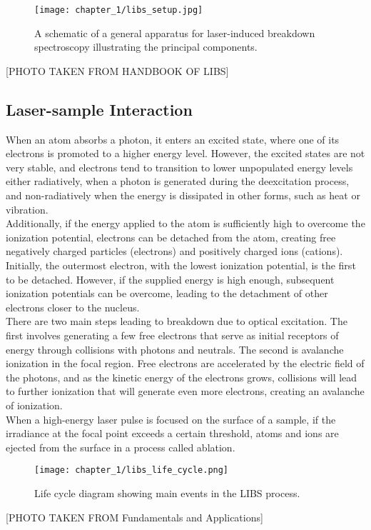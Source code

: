 \begin{figure}[H]
    \centering
    \texttt{[image: chapter\_1/libs\_setup.jpg]}
    \label{fig:libs_setup}
    \\[20pt]
    \caption{A schematic of a general apparatus for laser-induced breakdown spectroscopy illustrating the principal components.}
\end{figure}
[PHOTO TAKEN FROM HANDBOOK OF LIBS]

\subsection{Laser-sample Interaction}
\label{subsec:laser-sample_int}

When an atom absorbs a photon, it enters an excited state, where one of its electrons is promoted to a higher energy level. However, the excited states are not very stable, and electrons tend to transition to lower unpopulated energy levels either radiatively, when a photon is generated during the deexcitation process, and non-radiatively when the energy is dissipated in other forms, such as heat or vibration.
\\
Additionally, if the energy applied to the atom is sufficiently high to overcome the ionization potential, electrons can be detached from the atom, creating free negatively charged particles (electrons) and positively charged ions (cations). Initially, the outermost electron, with the lowest ionization potential, is the first to be detached. However, if the supplied energy is high enough, subsequent ionization potentials can be overcome, leading to the detachment of other electrons closer to the nucleus.
\\
There are two main steps leading to breakdown due to optical excitation. The first involves generating a few free electrons that serve as initial receptors of energy through collisions with photons and neutrals. The second is avalanche ionization in the focal region. Free electrons are accelerated by the electric field of the photons, and as the kinetic energy of the electrons grows, collisions will lead to further ionization that will generate even more electrons, creating an avalanche of ionization. 
\\
When a high-energy laser pulse is focused on the surface of a sample, if the irradiance at the focal point exceeds a certain threshold, atoms and ions are ejected from the surface in a process called ablation.

\begin{figure}[H]
    \centering
    \texttt{[image: chapter\_1/libs\_life\_cycle.png]}
    \label{fig:libs_setup}
    \\[40pt]
    \caption[LIBS life cycle.]{Life cycle diagram showing main events in the LIBS process.}
\end{figure}
[PHOTO TAKEN FROM Fundamentals and Applications]


